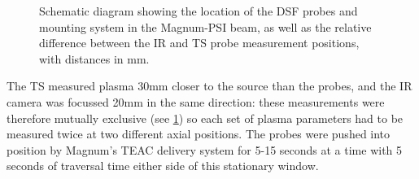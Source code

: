 \documentclass[a4paper, 11pt]{article} %
\begin{document}
	\begin{figure}
		\vspace{-5pt}
		\caption{\label{fig:schematic}Schematic diagram showing the location of the DSF probes and mounting system in the Magnum-PSI beam, as well as the relative difference between the IR and TS probe measurement positions, with distances in mm.}
		\vspace{-15pt}
	\end{figure}
	The TS measured plasma 30mm closer to the source than the probes, and the IR camera was focussed 20mm in the same direction: these measurements were therefore mutually exclusive (see \cref{fig:schematic}) so each set of plasma parameters had to be measured twice at two different axial positions.
	The probes were pushed into position by Magnum's TEAC delivery system for 5-15 seconds at a time with 5 seconds of traversal time either side of this stationary window. 
	
\end{document}
